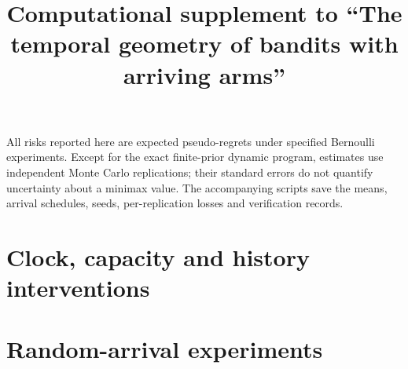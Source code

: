\documentclass[11pt]{article}
\title{Computational supplement to ``The temporal geometry of bandits with arriving arms''}
\author{}
\date{}
\begin{document}
\maketitle
All risks reported here are expected pseudo-regrets under specified
Bernoulli experiments. Except for the exact finite-prior dynamic
program, estimates use independent Monte Carlo replications; their
standard errors do not quantify uncertainty about a minimax value.
The accompanying scripts save the means, arrival schedules, seeds,
per-replication losses and verification records.
\tableofcontents

\section{Clock, capacity and history interventions}

\section{Random-arrival experiments}




\end{document}
